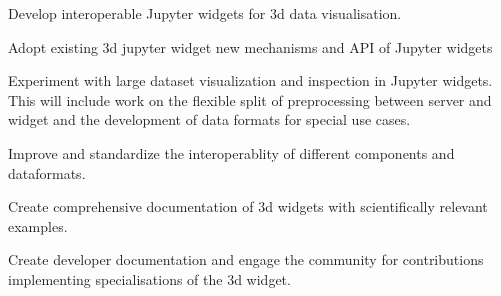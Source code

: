 \begin{task}[
  title=Jupyter Interactive Widgets,
  id=jupyter-widgets,
  lead=QS,
  PM=28,
  wphases={0-48},
  partners={XFEL,SIL}
]
\begin{compactenum}
\item
  Develop interoperable Jupyter widgets for 3d data visualisation.

  \begin{compactenum}
  \item 
    Adopt existing 3d jupyter widget new mechanisms and API of Jupyter widgets

  \item
    Experiment with large dataset visualization and inspection in Jupyter widgets. This will include work on the flexible split of preprocessing between server and widget and the development of data formats for special use cases. 
    
  \item 
    Improve and standardize the interoperablity of  different components and dataformats. 
    
  \item 
    Create comprehensive documentation of 3d widgets with scientifically relevant examples.

  \item 
    Create developer documentation and engage the community for contributions implementing specialisations of the 3d widget.
  
  \end{compactenum}

\end{compactenum}

\end{task}
